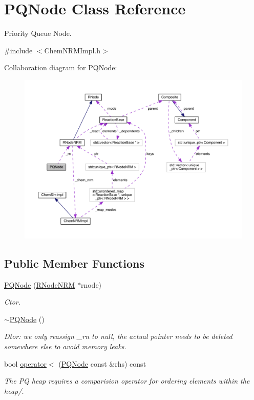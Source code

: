 \hypertarget{classPQNode}{\section{P\+Q\+Node Class Reference}
\label{classPQNode}
}


Priority Queue Node.  




{\ttfamily \#include $<$Chem\+N\+R\+M\+Impl.\+h$>$}



Collaboration diagram for P\+Q\+Node\+:\nopagebreak
\begin{figure}[H]
\begin{center}
\leavevmode
\includegraphics[width=350pt]{classPQNode__coll__graph}
\end{center}
\end{figure}
\subsection*{Public Member Functions}
\begin{DoxyCompactItemize}
\item 
\hyperlink{classPQNode_a4b7e508ee10dbc6cb1bbabf8bcda593a}{P\+Q\+Node} (\hyperlink{classRNodeNRM}{R\+Node\+N\+R\+M} $\ast$rnode)
\begin{DoxyCompactList}\small\item\em Ctor. \end{DoxyCompactList}\item 
\hyperlink{classPQNode_ac96492ddb5848c1d3cad999299caa77c}{$\sim$\+P\+Q\+Node} ()
\begin{DoxyCompactList}\small\item\em Dtor\+: we only reassign \+\_\+rn to null, the actual pointer needs to be deleted somewhere else to avoid memory leaks. \end{DoxyCompactList}\item 
bool \hyperlink{classPQNode_ac8c314f7f49375577b4b8ef2d90910b2}{operator$<$} (\hyperlink{classPQNode}{P\+Q\+Node} const \&rhs) const 
\begin{DoxyCompactList}\small\item\em The P\+Q heap requires a comparision operator for ordering elements within the heap/. \end{DoxyCompactList}\end{DoxyCompactItemize}
